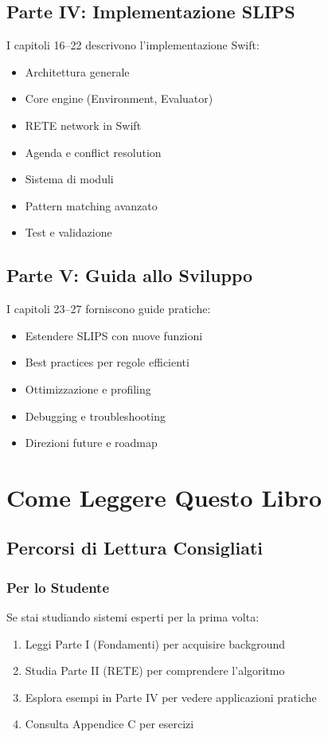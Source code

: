 \subsection{Parte IV: Implementazione SLIPS}

I capitoli 16--22 descrivono l'implementazione Swift:

\begin{itemize}
\item Architettura generale
\item Core engine (Environment, Evaluator)
\item RETE network in Swift
\item Agenda e conflict resolution
\item Sistema di moduli
\item Pattern matching avanzato
\item Test e validazione
\end{itemize}

\subsection{Parte V: Guida allo Sviluppo}

I capitoli 23--27 forniscono guide pratiche:

\begin{itemize}
\item Estendere SLIPS con nuove funzioni
\item Best practices per regole efficienti
\item Ottimizzazione e profiling
\item Debugging e troubleshooting
\item Direzioni future e roadmap
\end{itemize}

\section{Come Leggere Questo Libro}

\subsection{Percorsi di Lettura Consigliati}

\subsubsection{Per lo Studente}

Se stai studiando sistemi esperti per la prima volta:
\begin{enumerate}
\item Leggi Parte I (Fondamenti) per acquisire background
\item Studia Parte II (RETE) per comprendere l'algoritmo
\item Esplora esempi in Parte IV per vedere applicazioni pratiche
\item Consulta Appendice C per esercizi
\end{enumerate}

